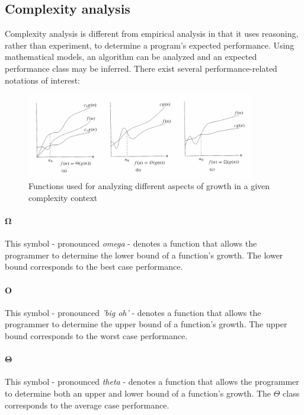 \documentclass{article}
\begin{document}
\subsection{Complexity analysis}
Complexity analysis is different from empirical analysis in that it uses reasoning, rather than experiment, to determine
a program's expected performance. Using mathematical models, an algorithm can be analyzed and an expected performance class
may be inferred. There exist several performance-related notations of interest:

\begin{samepage}
  \begin{figure}[H]
    \centering
    \includegraphics[width=10cm]{theta_o_omega}
    \caption{Functions used for analyzing different aspects of growth in a given complexity context}
  \end{figure}
  
  \paragraph{\(\boldsymbol \Omega\)}
  This symbol - pronounced {\em omega} - denotes a function that allows the programmer to determine the lower bound of a
  function's growth. The lower bound corresponds to the best case performance.
  
  \paragraph{\(\boldsymbol O\)}
  This symbol - pronounced {\em 'big oh'} - denotes a function that allows the programmer to determine the upper bound of a
  function's growth. The upper bound corresponds to the worst case performance.
  
  \paragraph{\(\boldsymbol \Theta\)}
  This symbol - pronounced {\em theta} - denotes a function that allows the programmer to determine both an upper and lower
  bound of a function's growth. The \(\Theta\) class corresponds to the average case performance.
\end{samepage}
\end{document}
